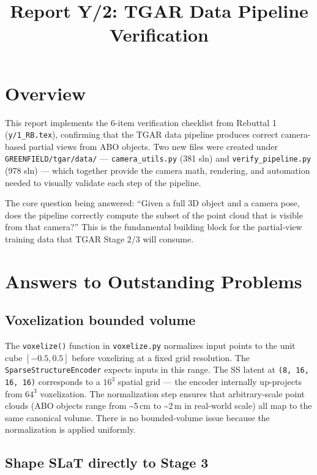 \title{Report Y/2: TGAR Data Pipeline Verification}

\maketitle

\section{Overview}

This report implements the 6-item verification checklist from Rebuttal 1
(\texttt{y/1\_RB.tex}), confirming that the TGAR data pipeline produces
correct camera-based partial views from ABO objects. Two new files were
created under \texttt{GREENFIELD/tgar/data/} --- \texttt{camera\_utils.py}
(381 sln) and \texttt{verify\_pipeline.py} (978 sln) --- which together
provide the camera math, rendering, and automation needed to visually
validate each step of the pipeline.

The core question being answered: ``Given a full 3D object and a camera
pose, does the pipeline correctly compute the subset of the point cloud
that is visible from that camera?'' This is the fundamental building block
for the partial-view training data that TGAR Stage 2/3 will consume.

\section{Answers to Outstanding Problems}

\subsection{Voxelization bounded volume}

The \texttt{voxelize()} function in \texttt{voxelize.py} normalizes input
points to the unit cube $[-0.5, 0.5]$ before voxelizing at a fixed grid
resolution. The \texttt{SparseStructureEncoder} expects inputs in this
range. The SS latent at \texttt{(8, 16, 16, 16)} corresponds to a $16^3$
spatial grid --- the encoder internally up-projects from $64^3$
voxelization. The normalization step ensures that arbitrary-scale point
clouds (ABO objects range from \textasciitilde{}5\,cm to \textasciitilde{}2\,m in
real-world scale) all map to the same canonical volume. There is no
bounded-volume issue because the normalization is applied uniformly.

\subsection{Shape SLaT directly to Stage 3}

